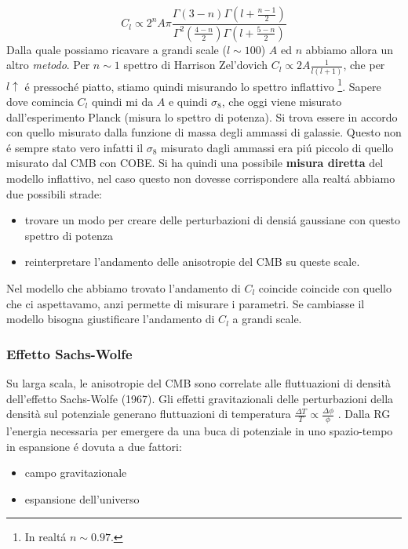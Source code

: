 \documentclass[12pt, a4paper]{article}
\begin{document}
\begin{equation}
C_l \propto 2^nA\pi \frac{\Gamma(3-n)\Gamma(l+\frac{n-1}{2})}{\Gamma^2(\frac{4-n}{2})\Gamma(l+\frac{5-n}{2})}
\end{equation}Dalla quale possiamo ricavare a grandi scale ($l\sim 100$) $A$ ed $n$ abbiamo allora un altro \textit{metodo}. Per $n\sim 1$ spettro di Harrison Zel'dovich $C_l\propto 2A\frac{1}{l(l+1)}$, che per $l \uparrow$ \'{e} pressoch\'{e} piatto, stiamo quindi misurando lo spettro inflattivo \footnote{In realt\'{a} $n\sim 0.97$.}. Sapere dove comincia $C_l$ quindi mi da $A$ e quindi $\sigma_8$, che oggi viene  misurato dall'esperimento Planck (misura lo spettro di potenza).  Si trova essere in accordo con quello misurato dalla funzione di massa degli ammassi di galassie. Questo non \'{e} sempre stato vero infatti il $\sigma_8$ misurato dagli ammassi era pi\'{u} piccolo di quello misurato dal CMB con COBE. Si ha quindi una possibile \textbf{misura diretta} del modello inflattivo, nel caso questo non dovesse corrispondere alla realt\'{a} abbiamo due possibili strade:
\begin{itemize}
\item trovare un modo per creare delle perturbazioni di densi\'{a} gaussiane con questo spettro di potenza
\item reinterpretare l'andamento delle anisotropie del CMB su queste scale.
\end{itemize}
Nel modello che abbiamo trovato l'andamento di $C_l$ coincide coincide con quello che ci aspettavamo, anzi permette di misurare i parametri. Se cambiasse il modello bisogna giustificare l'andamento di $C_l $ a grandi scale.
\subsubsection{Effetto Sachs-Wolfe}
Su larga scala, le anisotropie del CMB sono correlate alle fluttuazioni di densità dell'effetto Sachs-Wolfe (1967). Gli effetti gravitazionali delle perturbazioni della densità sul potenziale generano fluttuazioni di temperatura $\frac{\Delta T}{T}\propto\frac{\Delta \phi}{\phi}$ . Dalla RG l'energia necessaria per emergere da una buca di potenziale in uno spazio-tempo in espansione \'{e} dovuta a due fattori:
\begin{itemize}
\item campo gravitazionale 
\item espansione dell'universo
\end{itemize}
\end{document}
